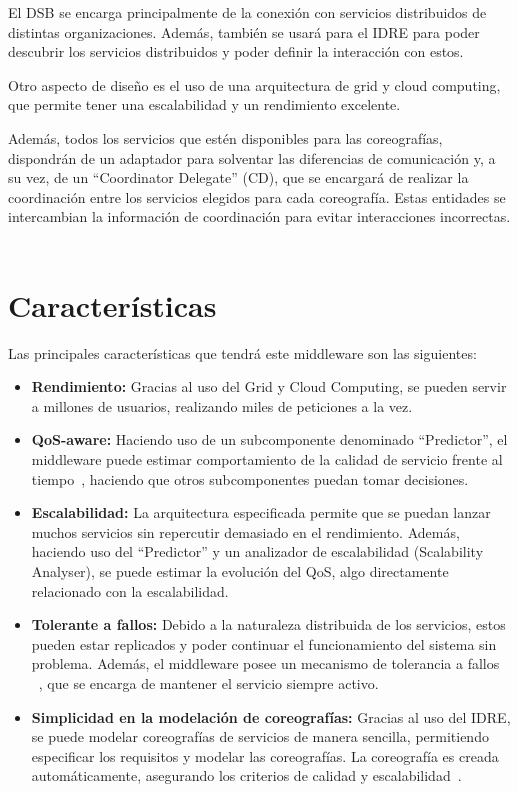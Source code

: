 \documentclass[runningheads]{llncs}
\begin{document}
El DSB se encarga principalmente de la conexión con servicios distribuidos de distintas organizaciones. Además, también se usará para el IDRE para poder descubrir los servicios distribuidos y poder definir la interacción con estos. ~\cite{a_10}

Otro aspecto de diseño es el uso de una arquitectura de grid y cloud computing, que permite tener una escalabilidad y un rendimiento excelente.

Además, todos los servicios que estén disponibles para las coreografías, dispondrán de un adaptador para solventar las diferencias de comunicación y, a su vez, de un ``Coordinator Delegate'' (CD), que se encargará de realizar la coordinación entre los servicios elegidos para cada coreografía. Estas entidades se intercambian la información de coordinación para evitar interacciones incorrectas. ~\cite{a_2}

\section{Características}
Las principales características que tendrá este middleware son las siguientes:

\begin{itemize}
    \item \textbf{Rendimiento: }Gracias al uso del Grid y Cloud Computing, se pueden servir a millones de usuarios, realizando miles de peticiones a la vez.~\cite{a_1}
    \item \textbf{QoS-aware: }Haciendo uso de un subcomponente denominado ``Predictor'', el middleware puede estimar comportamiento de la calidad de servicio frente al tiempo~\cite{a_10}, haciendo que otros subcomponentes puedan tomar decisiones. 
    \item \textbf{Escalabilidad: }La arquitectura especificada permite que se puedan lanzar muchos servicios sin repercutir demasiado en el rendimiento. Además, haciendo uso del ``Predictor'' y un analizador de escalabilidad (Scalability Analyser), se puede estimar la evolución del QoS, algo directamente relacionado con la escalabilidad. ~\cite{a_10}
    \item \textbf{Tolerante a fallos: }Debido a la naturaleza distribuida de los servicios, estos pueden estar replicados y poder continuar el funcionamiento del sistema sin problema. Además, el middleware posee un mecanismo de tolerancia a fallos ~\cite{a_20}, que se encarga de mantener el servicio siempre activo.
    \item \textbf{Simplicidad en la modelación de coreografías: }Gracias al uso del IDRE, se puede modelar coreografías de servicios de manera sencilla, permitiendo especificar los requisitos y modelar las coreografías. La coreografía es creada automáticamente, asegurando los criterios de calidad y escalabilidad~\cite{a_2}.
\end{itemize}
\end{document}
